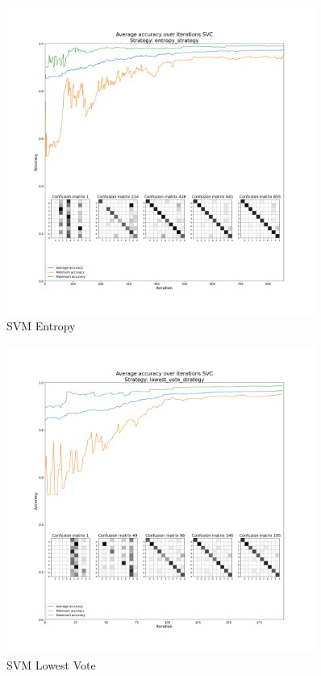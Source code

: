 \begin{figure}[htbp]
\centering
\includegraphics[width=0.9\textwidth]{resources/images/active_learning_SVC_entropy_strategy_average.png}
\caption{SVM Entropy}
\end{figure}

\begin{figure}[htbp]
\centering
\includegraphics[width=0.9\textwidth]{resources/images/active_learning_SVC_lowest_vote_strategy_average.png}
\caption{SVM Lowest Vote}
\end{figure}
